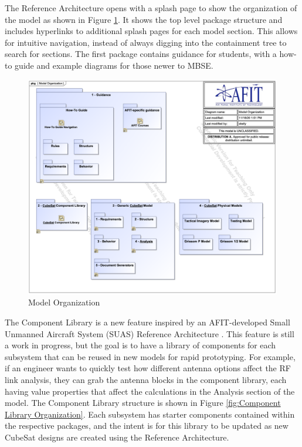 \documentclass[conference]{joss-pretty}
\begin{document}
The Reference Architecture opens with a splash page to show the organization of the model as shown in Figure \ref{fig:Model Organization}. It shows the top level package structure and includes hyperlinks to additional splash pages for each model section. This allows for intuitive navigation, instead of always digging into the containment tree to search for sections. The first package contains guidance for students, with a how-to guide and example diagrams for those newer to MBSE. 

\begin{figure}
    \centering
    \includegraphics[width=\textwidth]{Figures/Model Organization.png}
    \caption{Model Organization}
    \label{fig:Model Organization}
\end{figure}

The Component Library is a new feature inspired by an AFIT-developed Small Unmanned Aircraft System (SUAS) Reference Architecture \citep{Jacques2019}. This feature is still a work in progress, but the goal is to have a library of components for each subsystem that can be reused in new models for rapid prototyping. For example, if an engineer wants to quickly test how different antenna options affect the RF link analysis, they can grab the antenna blocks in the component library, each having value properties that affect the calculations in the Analysis section of the model. The Component Library structure is shown in Figure \ref{fig:Component Library Organization}. Each subsystem has starter components contained within the respective packages, and the intent is for this library to be updated as new CubeSat designs are created using the Reference Architecture. 
\end{document}
